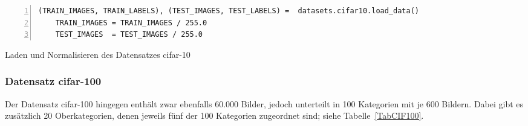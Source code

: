 \begin{code}
\begin{lstlisting}[language=MyPython, numbers=left,label={src:cifarimport}]
	(TRAIN_IMAGES, TRAIN_LABELS), (TEST_IMAGES, TEST_LABELS) =  datasets.cifar10.load_data()
	TRAIN_IMAGES = TRAIN_IMAGES / 255.0
	TEST_IMAGES  = TEST_IMAGES / 255.0
\end{lstlisting}
  \caption{Laden und Normalisieren des Datensatzes \ac{cifar}-10}
\end{code}


\subsubsection{Datensatz \ac{cifar}-100}\label{sec:dataset}


Der Datensatz \ac{cifar}-100 hingegen enthält zwar ebenfalls 60.000 Bilder, jedoch unterteilt in 100 Kategorien mit je 600 Bildern. Dabei gibt es zusätzlich 20 Oberkategorien, denen jeweils fünf der 100 Kategorien zugeordnet sind; siehe Tabelle~\ref{TabCIF100}.

